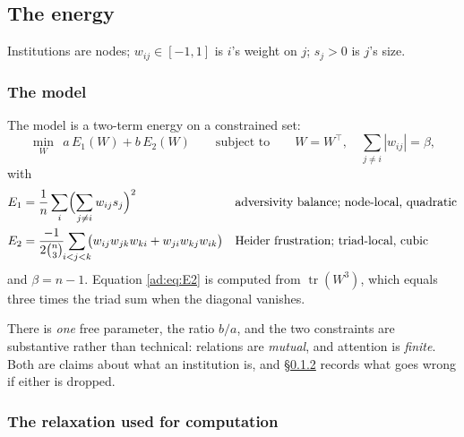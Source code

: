 \documentclass[11pt]{article}
\numberwithin{equation}{section}
\theoremstyle{plain}
\theoremstyle{definition}
\theoremstyle{remark}
\begin{document}
\subsection{The energy}\label{ad:sub:energy}

Institutions are nodes; $w_{ij}\in[-1,1]$ is $i$'s weight on $j$;
$s_j>0$ is $j$'s size.

\subsubsection{The model}\label{ad:subsub:constrained}

The model is a two-term energy on a constrained set:
\begin{equation}\label{ad:eq:model}
\min_{W}\ \ a\,E_1(W)+b\,E_2(W)
\qquad\text{subject to}\qquad
W=W^{\!\top},\quad \sum_{j\ne i}|w_{ij}|=\beta ,
\end{equation}
with
\begin{align}
E_1&=\frac1n\sum_i\Bigl(\sum_{j\ne i}w_{ij}s_j\Bigr)^{2}
&&\text{adversivity balance; node-local, quadratic}\label{ad:eq:E1}\\
E_2&=\frac{-1}{2\binom n3}\!\!\sum_{i<j<k}\!\!
\bigl(w_{ij}w_{jk}w_{ki}+w_{ji}w_{kj}w_{ik}\bigr)
&&\text{Heider frustration; triad-local, cubic}\label{ad:eq:E2}
\end{align}
and $\beta=n-1$. Equation \eqref{ad:eq:E2} is computed from
$\operatorname{tr}(W^{3})$, which equals three times the triad sum when
the diagonal vanishes.

There is \emph{one} free parameter, the ratio $b/a$, and the two
constraints are substantive rather than technical: relations are
\emph{mutual}, and attention is \emph{finite}. Both are claims about
what an institution is, and \S\ref{ad:subsub:relaxation} records what
goes wrong if either is dropped.

\subsubsection{The relaxation used for computation}
\label{ad:subsub:relaxation}
\end{document}
